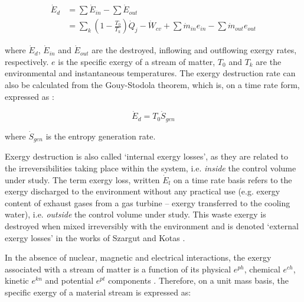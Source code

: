 \documentclass[final,times,5p]{elsarticle}
\begin{document}
	\begin{align}
		\dot{E}_d&=\sum \dot{E}_{in} - \sum \dot{E}_{out} \nonumber\\
					  &=\sum_k \left (1-\frac{T_0}{T_k} \right ) \dot{Q}_j-\dot{W}_{cv}+\sum \dot{m}_{in} e_{in} - \sum \dot{m}_{out} e_{out}
	\end{align}

	where $\dot{E}_d$, $\dot{E}_{in}$ and $\dot{E}_{out}$ are the destroyed, inflowing and outflowing exergy rates, respectively. $e$ is the specific exergy of a stream of matter, $T_0$ and $T_k$ are the environmental and instantaneous temperatures.  The exergy destruction rate can also be calculated from the Gouy-Stodola theorem, which is, on a time rate form, expressed as \cite{Bejan2006}:

		
	\begin{equation}
		\dot{E}_d=T_0\dot{S}_{gen}
	\end{equation}
	
	where $\dot{S}_{gen}$ is the entropy generation rate.

	Exergy destruction is also called `internal exergy losses', as they are related to the irreversibilities taking place within the system, i.e. \emph{inside} the control volume under study. The term exergy loss, written $\dot{E}_l$ on a time rate basis \cite{BejanAdrian;TsatsaronisGeorge;Moran1996} refers to the exergy discharged to the environment without any practical use (e.g. exergy content of exhaust gases from a gas turbine -- exergy transferred to the cooling water), i.e. \emph{outside} the control volume under study. This waste exergy is destroyed when mixed irreversibly with the environment and is denoted `external exergy losses' in the works of Szargut and Kotas \cite{Szargut1998,Kotas1995}. 

	In the absence of nuclear, magnetic and electrical interactions, the exergy associated with a stream of matter is a function of its physical $e^{ph}$, chemical $e^{ch}$, kinetic $e^{kn}$ and potential $e^{pt}$ components \cite{BejanAdrian;TsatsaronisGeorge;Moran1996}. Therefore, on a unit mass basis, the specific exergy of a material stream is expressed as:
\end{document}
